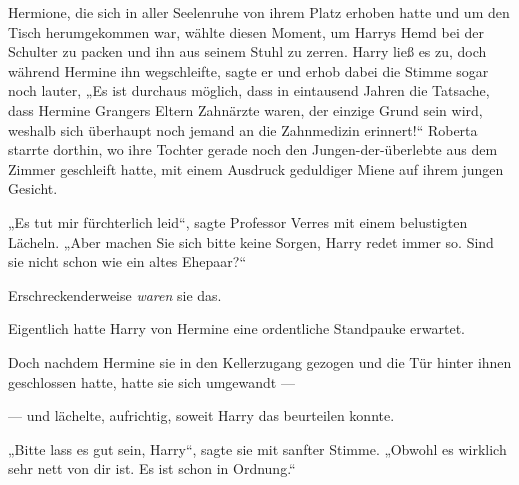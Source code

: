 Hermione, die sich in aller Seelenruhe von ihrem Platz erhoben hatte und um den Tisch herumgekommen war, wählte diesen Moment, um Harrys Hemd bei der Schulter zu packen und ihn aus seinem Stuhl zu zerren. Harry ließ es zu, doch während Hermine ihn wegschleifte, sagte er und erhob dabei die Stimme sogar noch lauter,
„Es ist durchaus möglich, dass in eintausend Jahren die Tatsache, dass Hermine Grangers Eltern Zahnärzte waren, der einzige Grund sein wird, weshalb sich überhaupt noch jemand an die Zahnmedizin erinnert!“
Roberta starrte dorthin, wo ihre Tochter gerade noch den Jungen-der-überlebte aus dem Zimmer geschleift hatte, mit einem Ausdruck geduldiger Miene auf ihrem jungen Gesicht.

„Es tut mir fürchterlich leid“, sagte Professor Verres mit einem belustigten Lächeln.
„Aber machen Sie sich bitte keine Sorgen, Harry redet immer so. Sind sie nicht schon wie ein altes Ehepaar?“

Erschreckenderweise \emph{waren} sie das.

\later

Eigentlich hatte Harry von Hermine eine ordentliche Standpauke erwartet.

Doch nachdem Hermine sie in den Kellerzugang gezogen und die Tür hinter ihnen geschlossen hatte, hatte sie sich umgewandt —

— und lächelte, aufrichtig, soweit Harry das beurteilen konnte.

„Bitte lass es gut sein, Harry“, sagte sie mit sanfter Stimme.
„Obwohl es wirklich sehr nett von dir ist. Es ist schon in Ordnung.“

